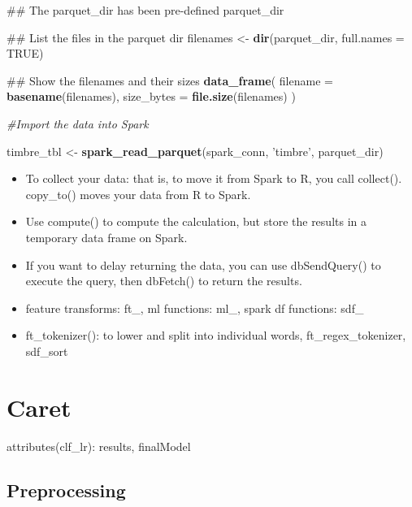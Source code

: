 \documentclass[]{book}
\newenvironment{Shaded}{\begin{snugshade}}{\end{snugshade}}
\newcommand{\KeywordTok}[1]{\textcolor[rgb]{0.13,0.29,0.53}{\textbf{#1}}}
\newcommand{\DataTypeTok}[1]{\textcolor[rgb]{0.13,0.29,0.53}{#1}}
\newcommand{\StringTok}[1]{\textcolor[rgb]{0.31,0.60,0.02}{#1}}
\newcommand{\CommentTok}[1]{\textcolor[rgb]{0.56,0.35,0.01}{\textit{#1}}}
\newcommand{\OtherTok}[1]{\textcolor[rgb]{0.56,0.35,0.01}{#1}}
\newcommand{\NormalTok}[1]{#1}
\begin{document}
\begin{Shaded}
\begin{Highlighting}[]
\NormalTok{## The parquet_dir has been pre-defined}
\NormalTok{parquet_dir}

\NormalTok{## List the files in the parquet dir}
\NormalTok{filenames <-}\StringTok{ }\KeywordTok{dir}\NormalTok{(parquet_dir, }\DataTypeTok{full.names =} \OtherTok{TRUE}\NormalTok{)}

\NormalTok{## Show the filenames and their sizes}
\KeywordTok{data_frame}\NormalTok{(}
  \DataTypeTok{filename =} \KeywordTok{basename}\NormalTok{(filenames),}
  \DataTypeTok{size_bytes =} \KeywordTok{file.size}\NormalTok{(filenames)}
\NormalTok{)}

\CommentTok{#Import the data into Spark}

\NormalTok{timbre_tbl <-}\StringTok{ }\KeywordTok{spark_read_parquet}\NormalTok{(spark_conn, }\StringTok{'timbre'}\NormalTok{, parquet_dir)}
\end{Highlighting}
\end{Shaded}

\begin{itemize}
\item
  To collect your data: that is, to move it from Spark to R, you call
  collect(). copy\_to() moves your data from R to Spark.
\item
  Use compute() to compute the calculation, but store the results in a
  temporary data frame on Spark.
\item
  If you want to delay returning the data, you can use dbSendQuery() to
  execute the query, then dbFetch() to return the results.
\item
  feature transforms: ft\_, ml functions: ml\_, spark df functions:
  sdf\_
\item
  ft\_tokenizer(): to lower and split into individual words,
  ft\_regex\_tokenizer, sdf\_sort
\end{itemize}

\section{Caret}\label{caret}

attributes(clf\_lr): results, finalModel

\subsection{Preprocessing}\label{preprocessing}
\end{document}
